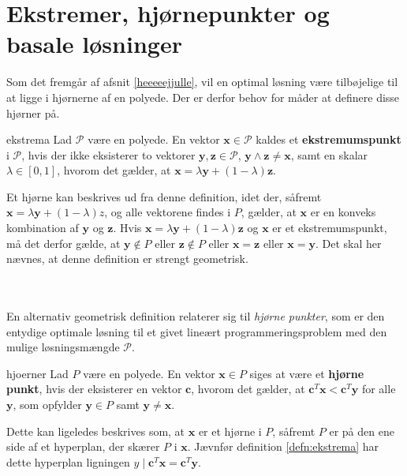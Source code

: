\section{Ekstremer, hjørnepunkter og basale løsninger}
%
Som det fremgår af afsnit \ref{heeeeejjulle}, vil en optimal løsning være tilbøjelige til at ligge i hjørnerne af en polyede.
Der er derfor behov for måder at definere disse hjørner på.
%
\begin{defn}{}{ekstrema}
Lad $\mathcal{P}$ være en polyede. 
En vektor $\mathbf{x} \in \mathcal{P}$ kaldes et \textbf{ekstremumspunkt} i $\mathcal{P}$, hvis der ikke eksisterer to vektorer $\mathbf{y},\mathbf{z} \in \mathcal{P}$, $\mathbf{y} \land \mathbf{z} \neq \mathbf{x}$, 
samt en skalar $\lambda \in [0,1]$, hvorom det gælder, at $\mathbf{x}=\lambda\mathbf{y}+(1-\lambda)\textbf{z}$.
\end{defn}
\noindent
%
%
Et hjørne kan beskrives ud fra denne definition, idet der, såfremt $\mathbf{x}=\lambda\mathbf{y}+(1-\lambda)z$, og alle vektorene findes i $P$, gælder, at $\mathbf{x}$ er en konveks kombination af $\mathbf{y}$ og $\mathbf{z}$.
Hvis $\mathbf{x}=\lambda\mathbf{y}+(1-\lambda)\textbf{z}$ og $\mathbf{x}$ er et ekstremumspunkt, må det derfor gælde, at $\mathbf{y}\notin P$ eller $\mathbf{z}\notin P$ eller $\mathbf{x}=\mathbf{z}$ eller $\mathbf{x}=\mathbf{y}$. 
Det skal her nævnes, at denne definition er strengt geometrisk.
%

\\\\
%
En alternativ geometrisk definition relaterer sig til \textit{hjørne punkter}, som er den entydige optimale løsning til et givet lineært programmeringsproblem med den mulige løsningsmængde $\mathcal{P}$.
%
\begin{defn}{}{hjoerner}
Lad $P$ være en polyede. 
En vektor $\mathbf{x}\in P$ siges at være et \textbf{hjørne punkt}, hvis der eksisterer en vektor $\mathbf{c}$, hvorom det gælder, at $\mathbf{c}^T\mathbf{x}<\mathbf{c}^T\mathbf{y}$ for alle $\mathbf{y}$, som opfylder $\mathbf{y} \in P$ samt $\mathbf{y}\neq\mathbf{x}$.
\end{defn}
\noindent
%
%
Dette kan ligeledes beskrives som, at $\mathbf{x}$ er et hjørne i $P$, såfremt $P$ er på den ene side af et hyperplan, der skærer $P$ i $\mathbf{x}$. 
Jævnfør definition \ref{defn:ekstrema} har dette hyperplan ligningen $y \mid \mathbf{c}^T\mathbf{x}=\mathbf{c}^T\mathbf{y}.$